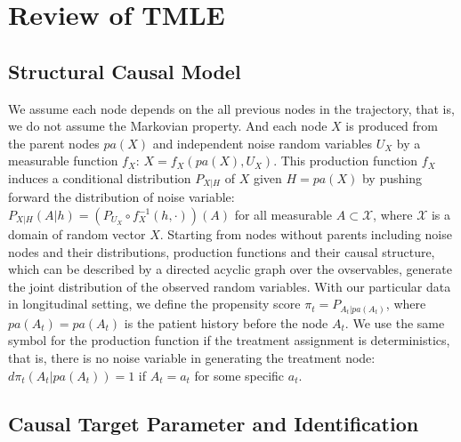 \documentclass{article}
\theoremstyle{plain}
\theoremstyle{definition}
\theoremstyle{remark}
\begin{document}
\section{Review of TMLE}

\label{sec:tmle}

\subsection{Structural Causal Model}

\label{sec:scm}

We assume each node depends on the all previous nodes in the trajectory, that is, we do not assume the Markovian property. And each node $X$ is produced from the parent nodes $pa(X)$ and independent noise random variables $U_X$ by a measurable function $f_X$: $X=f_X(pa(X),U_X)$. This production function $f_X$ induces a conditional distribution $P_{X|H}$ of $X$ given $H=pa(X)$ by pushing forward the distribution of noise variable: $P_{X|H}(A|h)=(P_{U_X}\circ f_X^{-1}(h, \cdot))(A)$ for all measurable $A\subset\mathcal{X}$, where $\mathcal{X}$ is a domain of random vector $X$. Starting from nodes without parents including noise nodes and their distributions, production functions and their causal structure, which can be described by a directed acyclic graph over the ovservables, generate the joint distribution of the observed random variables. With our particular data in longitudinal setting, we define the propensity score $\pi_t=P_{A_t|pa(A_t)}$, where $pa(A_t)=pa(A_t)$ is the patient history before the node $A_t$. We use the same symbol for the production function if the treatment assignment is deterministics, that is, there is no noise variable in generating the treatment node: $d\pi_t(A_t|pa(A_t))=1$ if $A_t=a_t$ for some specific $a_t$.

\subsection{Causal Target Parameter and Identification}
\end{document}
